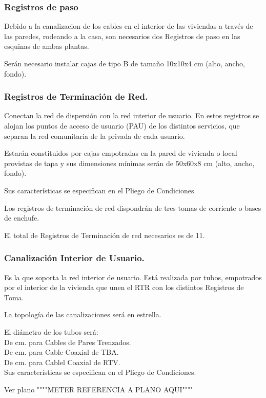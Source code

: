 \subsubsection*{Registros de paso}
Debido a la canalizacion de los cables en el interior de las viviendas a través de las paredes, rodeando a la casa, son necesarios dos Registros de paso en las esquinas de ambas plantas.

Serán necesario instalar cajas de tipo B de tamaño 10x10x4 cm (alto, ancho, fondo).

\subsubsection{Registros de Terminación de Red.}
Conectan la red de dispersión con la red interior de usuario. En estos registros se alojan los puntos de acceso de usuario (PAU) de los distintos servicios, que separan la red comunitaria de la privada de cada usuario.

Estarán constituidos por cajas empotradas en la pared de vivienda o local provistas de tapa y sus dimensiones mínimas serán de 50x60x8 cm (alto, ancho, fondo).

Sus características se especifican en el Pliego de Condiciones.

Los registros de terminación de red dispondrán de tres tomas de corriente o bases de enchufe.

El total de Registros de Terminación de red necesarios es de 11.

\subsubsection{Canalización Interior de Usuario.}
Es la que soporta la red interior de usuario. Está realizada por tubos, empotrados por el interior de la vivienda que unen el RTR con los distintos Registros de Toma.

La topología de las canalizaciones será en estrella.

El diámetro de los tubos será:\\
De  cm. para Cables de Pares Trenzados.\\
De  cm. para Cable Coaxial de TBA. \\
De  cm. para Cablel Coaxial de RTV. \\

Sus características se especifican en el Pliego de Condiciones.

Ver plano """"METER REFERENCIA A PLANO AQUI""""		

